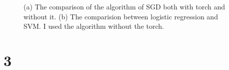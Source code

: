 \documentclass[10pt]{article}
\begin{document}
\begin{figure}[!h]
    \begin{center}
        \label{fig2}
    \end{center}
    \caption{(a) The comparison of the algorithm of SGD both with torch and without it. (b) The comparision between logistic regression and SVM. I used the algorithm without the torch.}
\end{figure}


\section*{3}
\end{document}

